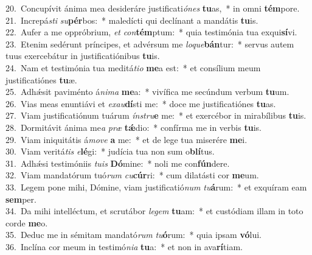 {20.~}Concupívit ánima mea desideráre justificati\textit{ó}\textit{nes} \textbf{tu}as,~* in omni \textbf{tém}pore.\\
{21.~}Increpá\textit{sti} \textit{su}\textbf{pér}bos:~* maledícti qui declínant a mandátis \textbf{tu}is.\\
{22.~}Aufer a me oppróbrium, \textit{et} \textit{con}\textbf{tém}ptum:~* quia testimónia tua exqui\textbf{sí}vi.\\
{23.~}Etenim sedérunt príncipes, et advérsum me \textit{lo}\textit{que}\textbf{bán}tur:~* servus autem tuus exercebátur in justificatiónibus \textbf{tu}is.\\
{24.~}Nam et testimónia tua meditá\textit{ti}\textit{o} \textbf{me}a est:~* et consílium meum justificatiónes \textbf{tu}æ.\\
{25.~}Adhǽsit paviménto á\textit{ni}\textit{ma} \textbf{me}a:~* vivífica me secúndum verbum \textbf{tu}um.\\
{26.~}Vias meas enuntiávi et \textit{e}\textit{xau}\textbf{dí}sti me:~* doce me justificatiónes \textbf{tu}as.\\
{27.~}Viam justificatiónum tuárum \textit{ín}\textit{stru}\textbf{e} me:~* et exercébor in mirabílibus \textbf{tu}is.\\
{28.~}Dormitávit ánima me\textit{a} \textit{præ} \textbf{tǽ}dio:~* confírma me in verbis \textbf{tu}is.\\
{29.~}Viam iniquitátis á\textit{mo}\textit{ve} \textbf{a} me:~* et de lege tua miserére \textbf{me}i.\\
{30.~}Viam veritá\textit{tis} \textit{e}\textbf{lé}gi:~* judícia tua non sum o\textbf{blí}tus.\\
{31.~}Adhǽsi testimóniis \textit{tu}\textit{is} \textbf{Dó}mine:~* noli me con\textbf{fún}dere.\\
{32.~}Viam mandatórum tuó\textit{rum} \textit{cu}\textbf{cúr}ri:~* cum dilatásti cor \textbf{me}um.\\
{33.~}Legem pone mihi, Dómine, viam justificatió\textit{num} \textit{tu}\textbf{á}rum:~* et exquíram eam \textbf{sem}per.\\
{34.~}Da mihi intelléctum, et scrutábor \textit{le}\textit{gem} \textbf{tu}am:~* et custódiam illam in toto corde \textbf{me}o.\\
{35.~}Deduc me in sémitam mandató\textit{rum} \textit{tu}\textbf{ó}rum:~* quia ipsam \textbf{vó}lui.\\
{36.~}Inclína cor meum in testimó\textit{ni}\textit{a} \textbf{tu}a:~* et non in ava\textbf{rí}tiam.\\
